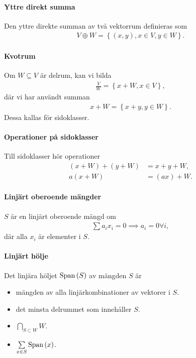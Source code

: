 \paragraph{Yttre direkt summa}
Den yttre direkte summan av två vektorrum definieras som
\begin{align*}
	V\oplus W = \left\{(x, y), x\in V, y\in W\right\}.
\end{align*}

\paragraph{Kvotrum}
Om $W\subseteq V$ är delrum, kan vi bilda
\begin{align*}
	\frac{V}{W} = \left\{x + W, x\in V\right\},
\end{align*}
där vi har användt summan
\begin{align*}
	x + W = \left\{x + y, y\in W\right\}.
\end{align*}
Dessa kallas för sidoklasser.

\paragraph{Operationer på sidoklasser}
Till sidoklasser hör operationer
\begin{align*}
	(x + W) + (y + W) &= x + y + W, \\
	a(x + W)          &= (ax) + W.
\end{align*}

\paragraph{Linjärt oberoende mängder}
$S$ är en linjärt oberoende mängd om
\begin{align*}
	\sum a_{i}x_{i} = 0\implies a_{i} = 0 \forall i,
\end{align*}
där alla $x_{i}$ är elementer i $S$.

\paragraph{Linjärt hölje}
Det linjära höljet $\text{Span}\left(S\right)$ av mängden $S$ är
\begin{itemize}
	\item mängden av alla linjärkombinationer av vektorer i $S$.
	\item det minsta delrummet som innehåller $S$.
	\item $\bigcap\limits_{S\subset W}W$.
	\item $\sum\limits_{x\in S} \text{Span}\left(x\right)$.
\end{itemize}

